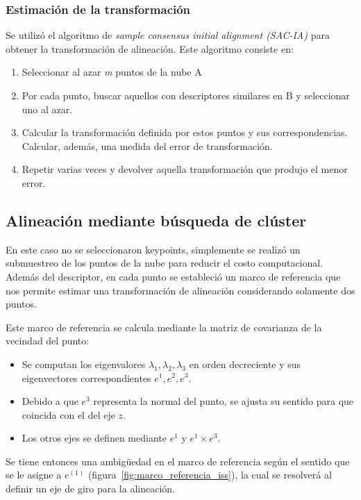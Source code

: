 		\subsubsection{Estimación de la transformación}
			Se utilizó el algoritmo de \emph{sample consensus initial alignment
			(SAC-IA)} para obtener la transformación de alineación. Este algoritmo
			consiste en:
			\begin{enumerate}
				\item Seleccionar al azar \emph{m} puntos de la nube A
				\item Por cada punto, buscar aquellos con descriptores similares en B y seleccionar uno al azar.
				\item Calcular la transformación definida por estos puntos y
					sus correspondencias. Calcular, además, una medida del
					error de transformación.
				\item Repetir varias veces y devolver aquella transformación que produjo el menor error.\cite{Rusu:2009:FPF:1703435.1703733}
			\end{enumerate}


	\subsection{Alineación mediante búsqueda de clúster}
		En este caso no se seleccionaron keypoints, simplemente se realizó un submuestreo de
		los puntos de la nube para reducir el costo computacional.
		Además del descriptor, en cada punto se estableció un marco de referencia
		que nos permite estimar
		una transformación de alineación considerando solamente dos puntos\cite{ISS}.

		Este marco de referencia se calcula mediante la matriz de covarianza de la vecindad del punto:
		\begin{itemize}
			\item Se computan los eigenvalores ${\lambda_1, \lambda_2, \lambda_3}$ en orden decreciente y sus eigenvectores correspondientes
				$e^{1}, e^{2}, e^{3}$.
			\item Debido a que $e^{3}$ representa la normal del punto, se ajusta su sentido para que coincida con el del eje $z$.
			\item Los otros ejes se definen mediante $e^{1}$ y $e^{1} \times e^{3}$.
		\end{itemize}
		Se tiene entonces una ambigüedad en el marco de referencia según el sentido que se le asigne a $e^{(1)}$ (figura~\ref{fig:marco_referencia_iss}),
		la cual se resolverá al definir un eje de giro para la alineación.

